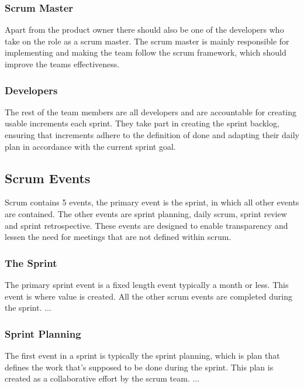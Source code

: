 \subsubsection{Scrum Master}
Apart from the product owner there should also be one of the developers who take on the role as a scrum master.
The scrum master is mainly responsible for implementing and making the team follow the scrum framework, which should improve the teams effectiveness. \cite{schwaber_sutherland_2022}

\subsubsection{Developers}
The rest of the team members are all developers and are accountable for creating usable increments each sprint.
They take part in creating the sprint backlog, ensuring that increments adhere to the definition of done and adapting their daily plan in accordance with the current sprint goal. \cite{schwaber_sutherland_2022}

\subsection{Scrum Events}
Scrum contains 5 events, the primary event is the sprint, in which all other events are contained. The other events are sprint planning, daily scrum, sprint review and sprint retrospective.
These events are designed to enable transparency and lessen the need for meetings that are not defined within scrum. \cite{schwaber_sutherland_2022}

\subsubsection{The Sprint}
The primary sprint event is a fixed length event typically a month or less. This event is where value is created.
All the other scrum events are completed during the sprint.
...\cite{schwaber_sutherland_2022}

\subsubsection{Sprint Planning}
The first event in a sprint is typically the sprint planning, which is plan that defines the work that's supposed to be done during the sprint.
This plan is created as a collaborative effort by the scrum team.
...

